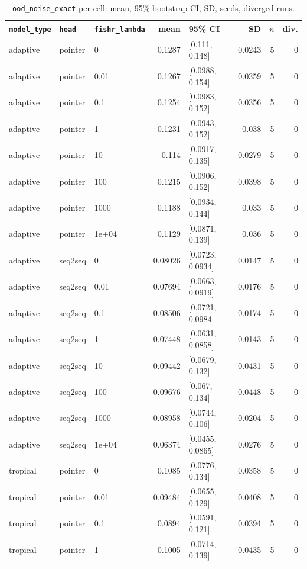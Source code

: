 \documentclass[10pt]{article}
\begin{document}
{\small
\begin{longtable}{lllrlrrr}
\caption{\texttt{ood\_noise\_exact} per cell: mean, 95\% bootstrap CI, SD, seeds, diverged runs.}\label{tab:summary-ood_noise_exact}\\
\toprule
\texttt{model\_type} & \texttt{head} & \texttt{fishr\_lambda} & mean & 95\% CI & SD & $n$ & div.\\
\midrule
\endhead
adaptive & pointer & 0 & 0.1287 & [0.111, 0.148] & 0.0243 & 5 & 0\\
adaptive & pointer & 0.01 & 0.1267 & [0.0988, 0.154] & 0.0359 & 5 & 0\\
adaptive & pointer & 0.1 & 0.1254 & [0.0983, 0.152] & 0.0356 & 5 & 0\\
adaptive & pointer & 1 & 0.1231 & [0.0943, 0.152] & 0.038 & 5 & 0\\
adaptive & pointer & 10 & 0.114 & [0.0917, 0.135] & 0.0279 & 5 & 0\\
adaptive & pointer & 100 & 0.1215 & [0.0906, 0.152] & 0.0398 & 5 & 0\\
adaptive & pointer & 1000 & 0.1188 & [0.0934, 0.144] & 0.033 & 5 & 0\\
adaptive & pointer & 1e+04 & 0.1129 & [0.0871, 0.139] & 0.036 & 5 & 0\\
adaptive & seq2seq & 0 & 0.08026 & [0.0723, 0.0934] & 0.0147 & 5 & 0\\
adaptive & seq2seq & 0.01 & 0.07694 & [0.0663, 0.0919] & 0.0176 & 5 & 0\\
adaptive & seq2seq & 0.1 & 0.08506 & [0.0721, 0.0984] & 0.0174 & 5 & 0\\
adaptive & seq2seq & 1 & 0.07448 & [0.0631, 0.0858] & 0.0143 & 5 & 0\\
adaptive & seq2seq & 10 & 0.09442 & [0.0679, 0.132] & 0.0431 & 5 & 0\\
adaptive & seq2seq & 100 & 0.09676 & [0.067, 0.134] & 0.0448 & 5 & 0\\
adaptive & seq2seq & 1000 & 0.08958 & [0.0744, 0.106] & 0.0204 & 5 & 0\\
adaptive & seq2seq & 1e+04 & 0.06374 & [0.0455, 0.0865] & 0.0276 & 5 & 0\\
tropical & pointer & 0 & 0.1085 & [0.0776, 0.134] & 0.0358 & 5 & 0\\
tropical & pointer & 0.01 & 0.09484 & [0.0655, 0.129] & 0.0408 & 5 & 0\\
tropical & pointer & 0.1 & 0.0894 & [0.0591, 0.121] & 0.0394 & 5 & 0\\
tropical & pointer & 1 & 0.1005 & [0.0714, 0.139] & 0.0435 & 5 & 0\\

\end{longtable}}
\end{document}

